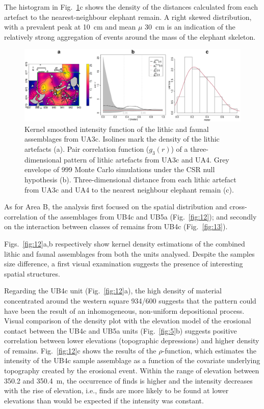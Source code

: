 \documentclass[preprint,authoryear,times]{elsarticle} %
\begin{document}
The histogram in Fig.~\ref{fig:11}c shows the density of the distances calculated from each artefact to the nearest-neighbour elephant remain. A right skewed distribution, with a prevalent peak at 10~cm and mean $\mu$ 30~cm is an indication of the relatively strong aggregation of events around the mass of the elephant skeleton.

\begin{figure}[]
  \centering
  \includegraphics[width=1\textwidth]{../artwork/Fig11.eps}
  \caption{Kernel smoothed intensity function of the lithic and faunal assemblages from UA3c. Isolines mark the density of the lithic artefacts (a). Pair correlation function ($g_3(r)$) of a three-dimensional pattern of lithic artefacts from UA3c and UA4. Grey envelope of 999 Monte Carlo simulations under the CSR null hypothesis (b). Three-dimensional distance from each lithic artefact from UA3c and UA4 to the nearest neighbour elephant remain (c).}
  \label{fig:11}
\end{figure}


As for Area B, the analysis first focused on the spatial distribution and cross-correlation of the assemblages from UB4c and UB5a (Fig.~\ref{fig:12}); and secondly on the interaction between classes of remains from UB4c (Fig.~\ref{fig:13}).

Figs.~\ref{fig:12}a,b respectively show kernel density estimations of the combined lithic and faunal assemblages from both the units analysed. Despite the samples size difference, a first visual examination suggests the presence of interesting spatial structures.

Regarding the UB4c unit (Fig.~\ref{fig:12}a), the high density of material concentrated around the western square 934/600 suggests that the pattern could have been the result of an inhomogeneous, non-uniform depositional process. Visual comparison of the density plot with the elevation model of the erosional contact between the UB4c and UB5a units (Fig.~\ref{fig:5}b) suggests positive correlation between lower elevations (topographic depressions) and higher density of remains. Fig.~\ref{fig:12}c shows the results of the $\rho$-function, which estimates the intensity of the UB4c sample assemblage as a function of the covariate underlying topography created by the erosional event. Within the range of elevation between 350.2 and 350.4~m, the occurrence of finds is higher and the intensity decreases with the rise of elevation, i.e., finds are more likely to be found at lower elevations than would be expected if the intensity was constant.
\end{document}
